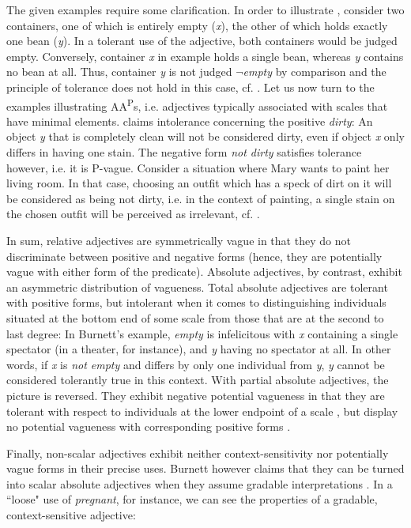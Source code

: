 \documentclass[output=paper]{langsci/langscibook}
\begin{document}
The given examples require some clarification. In order to illustrate , consider two containers, one of which is entirely empty (\textit{x}), the other of which holds exactly one bean (\textit{y}). In a tolerant use of the adjective, both containers would be judged empty. Conversely, container \textit{x} in example  holds a single bean, whereas \textit{y} contains no bean at all. Thus, container \textit{y} is not judged $\neg$\textit{empty} by comparison and the principle of tolerance does not hold in this case, cf. \textcite[51]{Burnett2017}. Let us now turn to the examples illustrating AA\textsuperscript{P}s, i.e. adjectives typically associated with scales that have minimal elements.  claims intolerance concerning the positive \textit{dirty}: An object \textit{y} that is completely clean will not be considered dirty, even if object \textit{x} only differs in having one stain. The negative form \textit{not dirty} satisfies tolerance however, i.e. it is P-vague. Consider a situation where Mary wants to paint her living room. In that case, choosing an outfit which has a speck of dirt on it will be considered as being not dirty, i.e. in the context of painting, a single stain on the chosen outfit will be perceived as irrelevant, cf. \textcite[52]{Burnett2017}.

In sum, relative adjectives are symmetrically vague in that they do not discriminate between positive and negative forms (hence, they are potentially vague with either form of the predicate). Absolute adjectives, by contrast, exhibit an asymmetric distribution of vagueness. Total absolute adjectives are tolerant with positive forms, but intolerant when it comes to distinguishing individuals situated at the bottom end of some scale from those that are at the second to last degree: In Burnett's \citeyearpar[52]{Burnett2017} example, \textit{empty} is infelicitous with \textit{x} containing a single spectator (in a theater, for instance), and \textit{y} having no spectator at all. In other words, if \textit{x} is \textit{not empty} and differs by only one individual from \textit{y}, \textit{y} cannot be considered tolerantly true in this context.
With partial absolute adjectives, the picture is reversed. They exhibit negative potential vagueness in that they are tolerant with respect to individuals at the lower endpoint of a scale , but display no potential vagueness with corresponding positive forms .

Finally, non-scalar adjectives exhibit neither context-sensitivity nor poten\-tial\-ly vague forms in their precise uses. Burnett however claims that they can be turned into scalar absolute adjectives when they assume gradable interpretations \citeyearpar[44]{Burnett2017}. In a ``loose" use of \textit{pregnant}, for instance, we can see the properties of a gradable, context-sensitive adjective:
\end{document}
